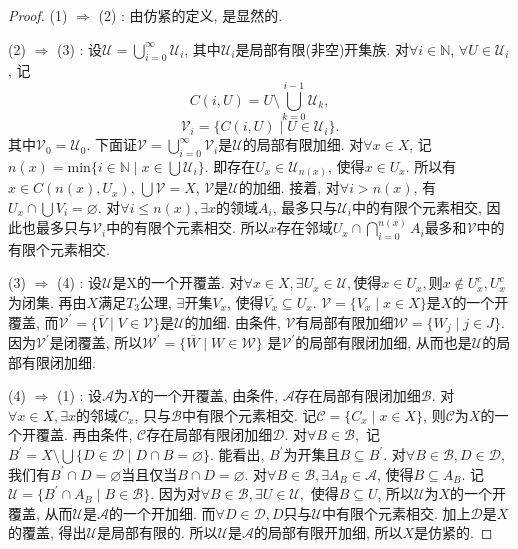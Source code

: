 \begin{proof}
  (1) $\Rightarrow$ (2) :
  由仿紧的定义, 是显然的.
  
  (2) $\Rightarrow$ (3) :
  设$\mathscr{U} = \bigcup_{i = 0}^{\infty} \mathscr{U}_i$,
  其中$\mathscr{U}_i$是局部有限(非空)开集族.
  对$\forall i \in \mathbb{N}$, $\forall U \in \mathscr{U}_i$, 记
  \[
    C(i, U) = U \setminus \bigcup_{k = 0}^{i - 1} \mathscr{U}_k,
  \]
  \[
    \mathscr{V}_i = \{ C(i, U) \mid U \in \mathscr{U}_i \}.
  \]
  其中$\mathscr{V}_0 = \mathscr{U}_0$.
  下面证$\mathscr{V} = \bigcup_{i = 0}^{\infty} \mathscr{V}_i$是$\mathscr{U}$的局部有限加细.
  对$\forall x \in X$,
  记$n(x) = \text{min}\{ i \in \mathbb{N} \mid x \in \bigcup \mathscr{U}_i \}$.
  即存在$U_x \in \mathscr{U}_{n(x)}$, 使得$x \in U_x$.
  所以有$x \in C(n(x), U_x)$, $\bigcup \mathscr{V} = X$, $\mathscr{V}$是$\mathscr{U}$的加细.
  接着, 对$\forall i > n(x)$, 有$U_x \cap \bigcup V_i = \varnothing$.
  对$\forall i \leq n(x), \exists x$的领域$A_i$,
  最多只与$\mathscr{U}_i$中的有限个元素相交,
  因此也最多只与$\mathscr{V}_i$中的有限个元素相交.
  所以$x$存在邻域$U_x \cap \bigcap_{i = 0}^{n(x)} A_i$最多和$\mathscr{V}$中的有限个元素相交.

  (3) $\Rightarrow$ (4) :
  设$\mathscr{U}$是X的一个开覆盖.
  对$\forall x \in X, \exists U_x \in \mathscr{U},
  $使得$x \in U_x, $则$x \notin U_x^c, U_x^c$为闭集.
  再由$X$满足$T_3$公理, $\exists $开集$V_x$, 使得$\overline{V_x} \subseteq U_x$.
  $\mathscr{V} = \{ V_x \mid x \in X \}$是$X$的一个开覆盖,
  而$\mathscr{V}^{'} = \{ \overline{V} \mid V \in \mathscr{V} \}$是$\mathscr{U}$的加细.
  由条件, $\mathscr{V}$有局部有限加细$\mathscr{W} = \{ W_j \mid j \in J \}$.
  因为$\mathscr{V}^{'}$是闭覆盖,
  所以$\mathscr{W}^{'} = \{ \overline{W} \mid W \in \mathscr{W} \}$
  是$\mathscr{V}^{'}$的局部有限闭加细, 从而也是$\mathscr{U}$的局部有限闭加细.
  
  (4) $\Rightarrow$ (1) :
  设$\mathscr{A}$为$X$的一个开覆盖, 由条件,
  $\mathscr{A}$存在局部有限闭加细$\mathscr{B}$.
  对$\forall x \in X, \exists x$的邻域$C_x$, 只与$\mathscr{B}$中有限个元素相交.
  记$\mathscr{C} = \{ C_x \mid x \in X \}$, 则$\mathscr{C}$为$X$的一个开覆盖.
  再由条件, $\mathscr{C}$存在局部有限闭加细$\mathscr{D}$.
  对$\forall B \in \mathscr{B},$ 
  记$B^{'} = X \setminus \bigcup \{ D \in \mathscr{D} \mid D \cap B = \varnothing \}$.
  能看出, $B^{'}$为开集且$B \subseteq B^{'}$.
  对$\forall B \in \mathscr{B}, D \in \mathscr{D}$,
  我们有$B^{'} \cap D = \varnothing$当且仅当$B \cap D = \varnothing$.
  对$\forall B \in \mathscr{B}, \exists A_B \in \mathscr{A}$,
  使得$B \subseteq A_B$. 记$\mathscr{U} = \{ B^{'} \cap A_B \mid B \in \mathscr{B} \}$.
  因为对$\forall B \in \mathscr{B}, \exists U \in \mathscr{U},$ 
  使得$B \subseteq U$, 所以$\mathscr{U}$为$X$的一个开覆盖, 
  从而$\mathscr{U}$是$\mathscr{A}$的一个开加细.
  而$\forall D \in \mathscr{D}, D$只与$\mathscr{U}$中有限个元素相交.
  加上$\mathscr{D}$是$X$的覆盖, 得出$\mathscr{U}$是局部有限的.
  所以$\mathscr{U}$是$\mathscr{A}$的局部有限开加细, 所以$X$是仿紧的.
\end{proof}

